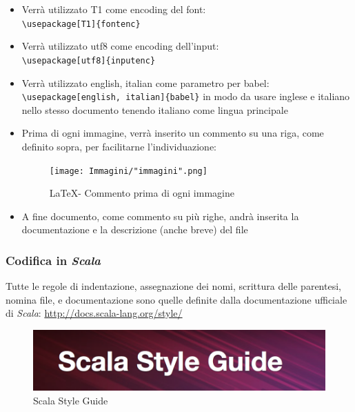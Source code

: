 \documentclass[a4paper]{article}
\begin{document}
\begin{itemize}
\begin{figure}[H]
			\end{figure}
			\item Verrà utilizzato T1 come encoding del font: \\ \verb|\usepackage[T1]{fontenc}|
			\item Verrà utilizzato utf8 come encoding dell'input: \\ \verb|\usepackage[utf8]{inputenc}|
			\item Verrà utilizzato english, italian come parametro per babel: \\
			\verb|\usepackage[english, italian]{babel}| in modo da usare inglese e italiano nello
			stesso documento tenendo italiano come lingua principale
			\item Prima di ogni immagine, verrà inserito un commento su una riga, come definito
			sopra, per facilitarne l'individuazione:
			\begin{figure}[H]
				\centering
				\texttt{[image: Immagini/"immagini".png]}
				\caption{\LaTeX \space - Commento prima di ogni immagine}
			\end{figure}
			\item A fine documento, come commento su più righe, andrà inserita la documentazione e la descrizione (anche breve) del file
		\end{itemize}
		
		
		\subsubsection{Codifica in \emph{Scala}}
		Tutte le regole di indentazione, assegnazione dei nomi, scrittura delle parentesi, nomina file, e documentazione sono quelle
		definite dalla documentazione ufficiale di \emph{Scala}: \url{http://docs.scala-lang.org/style/}
		\begin{figure}[H]
				\centering
				\includegraphics[scale=0.5]{scala-style.png}
				\caption{Scala Style Guide}
			\end{figure}
			
\end{document}
